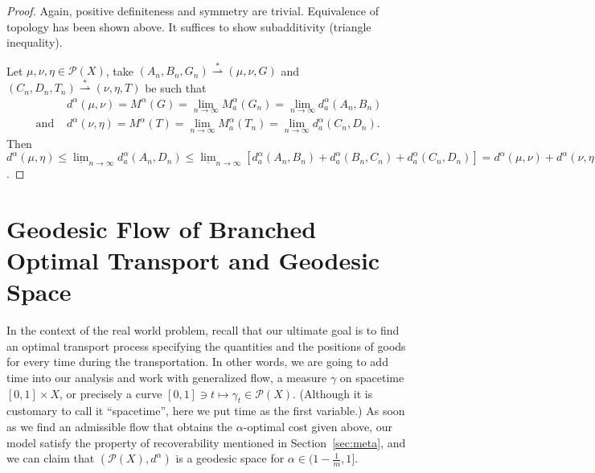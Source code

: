\documentclass[fleqn]{article}
\theoremstyle{definition}
\theoremstyle{remark}
\newcommand{\linf}[1][n]{\underline{\lim}_{#1\rightarrow\infty}} %
\renewcommand{\l}[1][n]{\lim_{#1\rightarrow\infty}} %
\renewcommand{\P}{\mathcal{P}} %
\newcommand{\wstar}{\stackrel{*}{\rightharpoonup}} %
\begin{document}
\begin{proof}[Proof]
Again, positive definiteness and symmetry are trivial. Equivalence of topology has been shown above. It suffices to show subadditivity (triangle inequality).
\par
Let $\mu,\nu,\eta \in\P(X)$, take $(A_n,B_n,G_n) \wstar (\mu,\nu,G)$ and $(C_n,D_n,T_n) \wstar (\nu,\eta,T)$ be such that
\begin{align*}
& d^\alpha(\mu,\nu)=M^\alpha(G)=\l M_a^\alpha(G_n) =\l d_a^\alpha(A_n,B_n) \\
\textrm{and } & d^\alpha(\nu,\eta)=M^\alpha(T)=\l M_a^\alpha(T_n) =\l d_a^\alpha(C_n,D_n).
\end{align*}
Then $d^\alpha(\mu,\eta) \le \linf d_a^\alpha(A_n,D_n) \le \linf \left[ d_a^\alpha(A_n,B_n) + d_a^\alpha(B_n,C_n) + d_a^\alpha(C_n,D_n) \right] = d^\alpha(\mu,\nu) + d^\alpha(\nu,\eta)$.
\end{proof}


\section{Geodesic Flow of Branched Optimal Transport and Geodesic Space } \label{sec:geodesic}
In the context of the real world problem, recall that our ultimate goal is to find an optimal transport process specifying the quantities and the positions of goods for every time during the transportation. In other words, we are going to add time into our analysis and work with generalized flow, a measure $\gamma$ on spacetime $[0,1]\times X$, or precisely a curve $[0,1]\ni t \mapsto \gamma_t \in\P(X)$. (Although it is customary to call it ``spacetime'', here we put time as the first variable.) As soon as we find an admissible flow that obtains the $\alpha$-optimal cost given above, our model satisfy the property of recoverability mentioned in Section~\ref{sec:meta}, and we can claim that $\left( \P(X),d^\alpha \right)$ is a geodesic space for $\alpha\in(1-\frac{1}{m},1]$.
\end{document}
